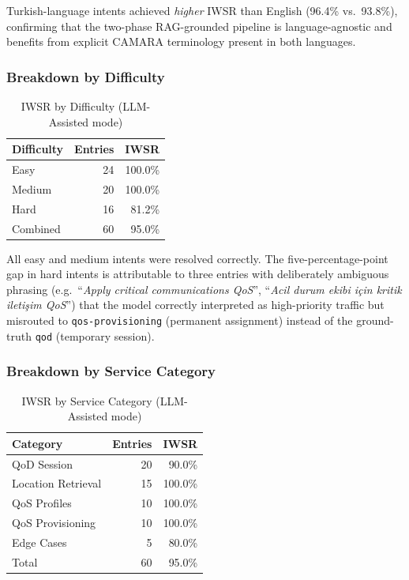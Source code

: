 \documentclass[conference]{IEEEtran}
\begin{document}
Turkish-language intents achieved \emph{higher} IWSR than English
(96.4\% vs.\ 93.8\%), confirming that the two-phase RAG-grounded pipeline
is language-agnostic and benefits from explicit CAMARA terminology present
in both languages.

\subsubsection{Breakdown by Difficulty}

\begin{table}[H]
\centering
\caption{IWSR by Difficulty (LLM-Assisted mode)}
\label{tab:diff}
\scriptsize
\begin{tabular}{lrr}
\toprule
\textbf{Difficulty} & \textbf{Entries} & \textbf{IWSR} \\
\midrule
Easy   & 24 & 100.0\% \\
Medium & 20 & 100.0\% \\
Hard   & 16 &  81.2\% \\
\midrule
Combined & 60 & 95.0\% \\
\bottomrule
\end{tabular}
\end{table}

All easy and medium intents were resolved correctly. The five-percentage-point
gap in hard intents is attributable to three entries with deliberately
ambiguous phrasing (e.g.\ ``\emph{Apply critical communications QoS}'',
``\emph{Acil durum ekibi için kritik iletişim QoS}'') that the model
correctly interpreted as high-priority traffic but misrouted to
\texttt{qos-provisioning} (permanent assignment) instead of the ground-truth
\texttt{qod} (temporary session).

\subsubsection{Breakdown by Service Category}

\begin{table}[H]
\centering
\caption{IWSR by Service Category (LLM-Assisted mode)}
\label{tab:cat}
\scriptsize
\begin{tabular}{lrr}
\toprule
\textbf{Category} & \textbf{Entries} & \textbf{IWSR} \\
\midrule
QoD Session        & 20 &  90.0\% \\
Location Retrieval & 15 & 100.0\% \\
QoS Profiles       & 10 & 100.0\% \\
QoS Provisioning   & 10 & 100.0\% \\
Edge Cases         &  5 &  80.0\% \\
\midrule
Total              & 60 &  95.0\% \\
\bottomrule
\end{tabular}
\end{table}
\end{document}
